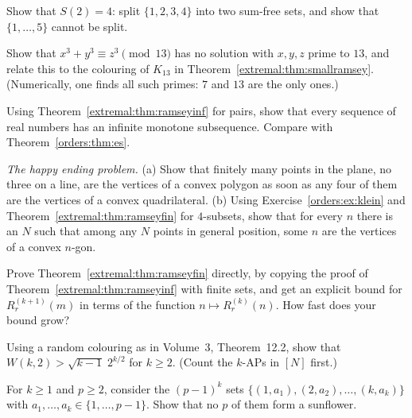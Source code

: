 \begin{exercise}[$\star$]\label{extremal:ex:schur2}
Show that $S(2)=4$: split $\{1,2,3,4\}$ into two sum-free sets, and show that $\{1,\dots,5\}$ cannot be split.
\end{exercise}

\begin{exercise}[$\star$]\label{extremal:ex:fermatp}
Show that $x^3+y^3\equiv z^3\pmod{13}$ has no solution with $x,y,z$ prime to $13$, and relate this to the colouring of $K_{13}$ in Theorem~\ref{extremal:thm:smallramsey}. (Numerically, one finds all such
primes: $7$ and $13$ are the only ones.)
\end{exercise}

\begin{exercise}[$\star$]\label{extremal:ex:monoseq}
Using Theorem~\ref{extremal:thm:ramseyinf} for pairs, show that every sequence of real numbers has an infinite monotone subsequence. Compare with Theorem~\ref{orders:thm:es}.
\end{exercise}

\begin{exercise}[$\star\star$]\label{extremal:ex:happyending}
\emph{The happy ending problem.} (a) Show that finitely many points in the plane, no three on a line, are the vertices of a convex polygon as soon as any four of them are
the vertices of a convex quadrilateral. (b) Using Exercise~\ref{orders:ex:klein} and Theorem~\ref{extremal:thm:ramseyfin} for $4$-subsets, show that for every $n$ there is an $N$ such that among any
$N$ points in general position, some $n$ are the vertices of a convex $n$-gon.
\end{exercise}

\begin{exercise}[$\star\star$]\label{extremal:ex:ramseydirect}
Prove Theorem~\ref{extremal:thm:ramseyfin} directly, by copying the proof of Theorem~\ref{extremal:thm:ramseyinf} with finite sets, and get an explicit bound for $R^{(k+1)}_r(m)$ in terms of the
function $n\mapsto R^{(k)}_r(n)$. How fast does your bound grow?
\end{exercise}

\begin{exercise}[$\star$]\label{extremal:ex:wlower}
Using a random colouring as in Volume~3, Theorem~12.2, show that $W(k,2)>\sqrt{k-1}\;2^{k/2}$ for $k\ge2$. (Count the $k$-APs in $[N]$ first.)
\end{exercise}

\begin{exercise}[$\star$]\label{extremal:ex:sunflowersharp}
For $k\ge1$ and $p\ge2$, consider the $(p-1)^k$ sets $\{(1,a_1),(2,a_2),\dots,(k,a_k)\}$ with $a_1,\dots,a_k\in\{1,\dots,p-1\}$. Show that no $p$ of them form a sunflower.
\end{exercise}

